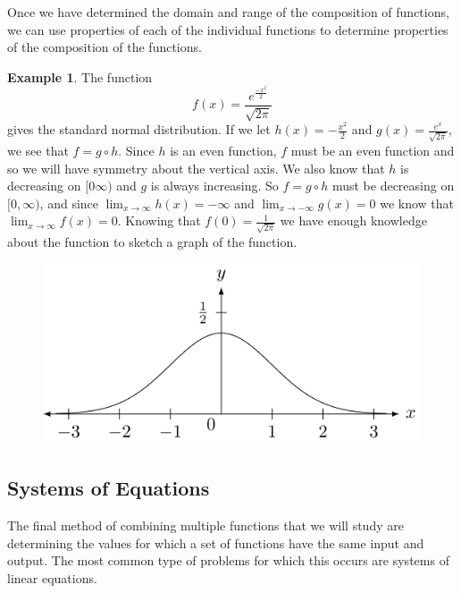 \documentclass[
]{book}
\theoremstyle{definition}
\theoremstyle{definition}
\newtheorem{example}{Example}[chapter]
\theoremstyle{definition}
\theoremstyle{remark}
\begin{document}
Once we have determined the domain and range of the composition of functions, we can use properties of each of the individual functions to determine properties of the composition of the functions.

\begin{example}
\protect\hypertarget{exm:unnamed-chunk-261}{}{\label{exm:unnamed-chunk-261} }The function
\[f(x) = \frac{e^{\frac{-x^2}{2}}}{\sqrt{2\pi}}\] gives the standard normal distribution. If we let \(h(x)=-\frac{x^2}{2}\) and \(g(x)=\frac{e^x}{\sqrt{2\pi}}\), we see that \(f=g\circ h\). Since \(h\) is an even function, \(f\) must be an even function and so we will have symmetry about the vertical axis. We also know that \(h\) is decreasing on \([0\infty)\) and \(g\) is always increasing. So \(f=g\circ h\) must be decreasing on \([0,\infty)\), and since \(\lim_{x\rightarrow \infty} h(x) = -\infty\) and \(\lim_{x\rightarrow -\infty} g(x) = 0\) we know that \(\lim_{x\rightarrow \infty} f(x) = 0\). Knowing that \(f(0)=\frac{1}{\sqrt{2\pi}}\) we have enough knowledge about the function to sketch a graph of the function.
\end{example}

\begin{figure}

{\centering \includegraphics[width=0.5\linewidth]{tikz/normal-distribution} 

}

\end{figure}

\hypertarget{systems-of-equations}{%
\subsection{Systems of Equations}\label{systems-of-equations}}

The final method of combining multiple functions that we will study are determining the values for which a set of functions have the same input and output. The most common type of problems for which this occurs are systems of linear equations.
\end{document}
